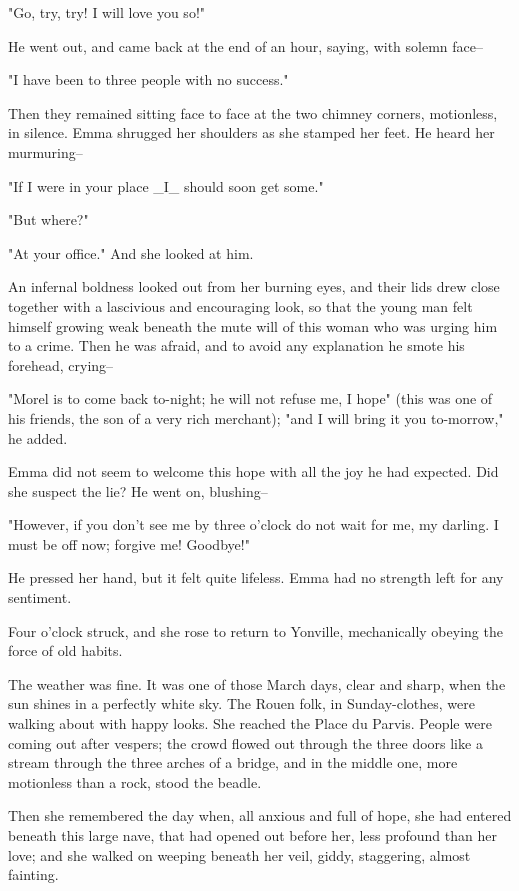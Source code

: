 \documentclass[11pt,twocolumn]{ltugboat}
\begin{document}
"Go, try, try! I will love you so!"

He went out, and came back at the end of an hour, saying, with solemn
face--

"I have been to three people with no success."

Then they remained sitting face to face at the two chimney corners,
motionless, in silence. Emma shrugged her shoulders as she stamped her
feet. He heard her murmuring--

"If I were in your place _I_ should soon get some."

"But where?"

"At your office." And she looked at him.

An infernal boldness looked out from her burning eyes, and their lids
drew close together with a lascivious and encouraging look, so that the
young man felt himself growing weak beneath the mute will of this woman
who was urging him to a crime. Then he was afraid, and to avoid any
explanation he smote his forehead, crying--

"Morel is to come back to-night; he will not refuse me, I hope" (this
was one of his friends, the son of a very rich merchant); "and I will
bring it you to-morrow," he added.

Emma did not seem to welcome this hope with all the joy he had expected.
Did she suspect the lie? He went on, blushing--

"However, if you don't see me by three o'clock do not wait for me, my
darling. I must be off now; forgive me! Goodbye!"

He pressed her hand, but it felt quite lifeless. Emma had no strength
left for any sentiment.

Four o'clock struck, and she rose to return to Yonville, mechanically
obeying the force of old habits.

The weather was fine. It was one of those March days, clear and sharp,
when the sun shines in a perfectly white sky. The Rouen folk, in
Sunday-clothes, were walking about with happy looks. She reached the
Place du Parvis. People were coming out after vespers; the crowd flowed
out through the three doors like a stream through the three arches of
a bridge, and in the middle one, more motionless than a rock, stood the
beadle.

Then she remembered the day when, all anxious and full of hope, she had
entered beneath this large nave, that had opened out before her, less
profound than her love; and she walked on weeping beneath her veil,
giddy, staggering, almost fainting.
\end{document}
